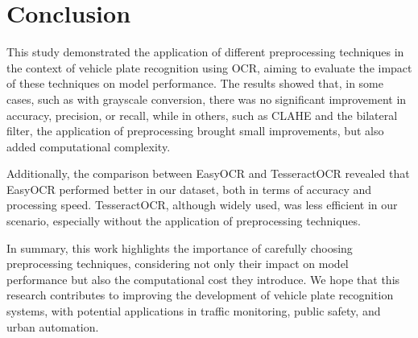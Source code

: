 \documentclass[conference]{IEEEtran}
\begin{document}
    \section{Conclusion}
    
    This study demonstrated the application of different preprocessing techniques in the context of vehicle plate recognition using OCR, aiming to evaluate the impact of these techniques on model performance. The results showed that, in some cases, such as with grayscale conversion, there was no significant improvement in accuracy, precision, or recall, while in others, such as CLAHE and the bilateral filter, the application of preprocessing brought small improvements, but also added computational complexity.
    
    Additionally, the comparison between EasyOCR and TesseractOCR revealed that EasyOCR performed better in our dataset, both in terms of accuracy and processing speed. TesseractOCR, although widely used, was less efficient in our scenario, especially without the application of preprocessing techniques.
    
    In summary, this work highlights the importance of carefully choosing preprocessing techniques, considering not only their impact on model performance but also the computational cost they introduce. We hope that this research contributes to improving the development of vehicle plate recognition systems, with potential applications in traffic monitoring, public safety, and urban automation.
    
    
    
\end{document}
